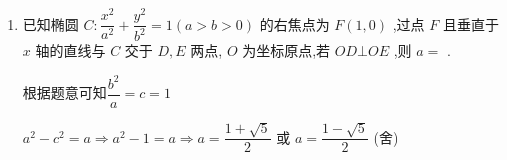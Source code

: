 \begin{enumerate}
\begin{jieda}
        ${a}^{2} - {c}^{2} = a \Longrightarrow  {a}^{2} - 2 = a \Longrightarrow  \left( {a - 2}\right) \left( {a + 1}\right)  = 0 \Longrightarrow  a = 2$ 或 $a =  - 1$ (舍)

        故$e = \dfrac{\sqrt{2}}{2}$
    \end{jieda}
    
    \item 已知椭圆 $C : \dfrac{{x}^{2}}{{a}^{2}} + \dfrac{{y}^{2}}{{b}^{2}} = 1\left( {a > b > 0}\right)$ 的右焦点为 $F\left( {1,0}\right)$ ,过点 $F$ 且垂直于 $x$ 轴的直线与 $C$ 交于 $D,E$ 两点, $O$ 为坐标原点,若 ${OD}\bot {OE}$ ,则 $a =$ .
    \begin{jieda}
        根据题意可知$\dfrac{b^2}{a} = c = 1$

        
        ${a}^{2} - {c}^{2} = a \Longrightarrow  {a}^{2} - 1 = a \Longrightarrow  a = \dfrac{1+\sqrt{5}}{2}$ 或 $a =  \dfrac{1-\sqrt{5}}{2}$ (舍)
    \end{jieda}
\end{enumerate}
